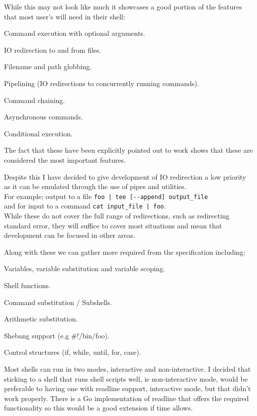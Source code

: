 While this may not look like much it showcases a good portion of the features that most user's will need in their shell:
\begin{itemize*}
    \item Command execution with optional arguments.
    \item IO redirection to and from files.
    \item Filename and path globbing.
    \item Pipelining (IO redirections to concurrently running commands).
    \item Command chaining.
    \item Asynchronous commands.
    \item Conditional execution.
\end{itemize*}
The fact that these have been explicitly pointed out to work shows that these are considered the most important features.

Despite this I have decided to give development of IO redirection a low priority as it can be emulated through the use of pipes and utilities. \\
For example; output to a file \verb!foo | tee [--append] output_file! \\
and for input to a command \verb!cat input_file | foo!.\\
While these do not cover the full range of redirections, such as redirecting standard error, they will suffice to cover most situations and mean that development can be focused in other areas.

Along with these we can gather more required from the specification including:
\begin{itemize*}
    \item Variables, variable substitution and variable scoping.
    \item Shell functions.
    \item Command substitution / Subshells.
    \item Arithmetic substitution.
    \item Shebang support (e.g \#!/bin/foo).
    \item Control structures (if, while, until, for, case).
\end{itemize*}

Most shells can run in two modes, interactive and non-interactive.
I decided that sticking to a shell that runs shell scripts well, ie non-interactive mode, would be preferable to having one with readline support, interactive mode, but that didn't work properly.
There is a Go implementation of readline that offers the required functionality\cite{GO-READLINE} so this would be a good extension if time allows.

